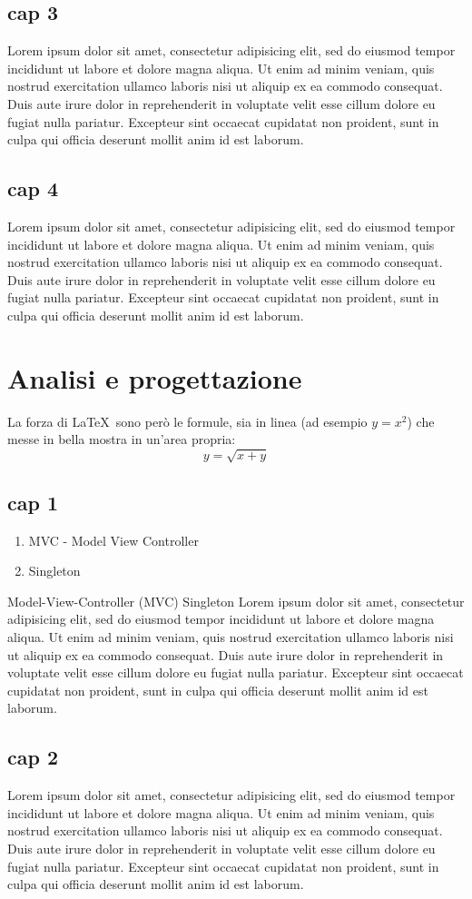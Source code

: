 \documentclass[a4paper,10pt]{report} %
\begin{document}
  \chapter{cap 3}
    Lorem ipsum dolor sit amet, consectetur adipisicing elit, sed do eiusmod tempor incididunt ut labore et dolore magna aliqua. Ut enim ad minim veniam, quis nostrud exercitation ullamco laboris nisi ut aliquip ex ea commodo consequat. Duis aute irure dolor in reprehenderit in voluptate velit esse cillum dolore eu fugiat nulla pariatur. Excepteur sint occaecat cupidatat non proident, sunt in culpa qui officia deserunt mollit anim id est laborum.
  \chapter{cap 4}
    Lorem ipsum dolor sit amet, consectetur adipisicing elit, sed do eiusmod tempor incididunt ut labore et dolore magna aliqua. Ut enim ad minim veniam, quis nostrud exercitation ullamco laboris nisi ut aliquip ex ea commodo consequat. Duis aute irure dolor in reprehenderit in voluptate velit esse cillum dolore eu fugiat nulla pariatur. Excepteur sint occaecat cupidatat non proident, sunt in culpa qui officia deserunt mollit anim id est laborum.
\newpage
\part{Analisi e progettazione} %
  La forza di \LaTeX\ sono però le formule, sia in linea (ad esempio \(y=x^2\))
   che messe in bella mostra in un'area propria:
  \[y=\sqrt{x+y}\]
  \chapter{cap 1}
	\begin{enumerate}
		\item MVC - Model View Controller
		\item Singleton
	\end{enumerate}
		Model-View-Controller (MVC)
		Singleton
    Lorem ipsum dolor sit amet, consectetur adipisicing elit, sed do eiusmod tempor incididunt ut labore et dolore magna aliqua. Ut enim ad minim veniam, quis nostrud exercitation ullamco laboris nisi ut aliquip ex ea commodo consequat. Duis aute irure dolor in reprehenderit in voluptate velit esse cillum dolore eu fugiat nulla pariatur. Excepteur sint occaecat cupidatat non proident, sunt in culpa qui officia deserunt mollit anim id est laborum.
  \chapter{cap 2}
    Lorem ipsum dolor sit amet, consectetur adipisicing elit, sed do eiusmod tempor incididunt ut labore et dolore magna aliqua. Ut enim ad minim veniam, quis nostrud exercitation ullamco laboris nisi ut aliquip ex ea commodo consequat. Duis aute irure dolor in reprehenderit in voluptate velit esse cillum dolore eu fugiat nulla pariatur. Excepteur sint occaecat cupidatat non proident, sunt in culpa qui officia deserunt mollit anim id est laborum.
\end{document}
